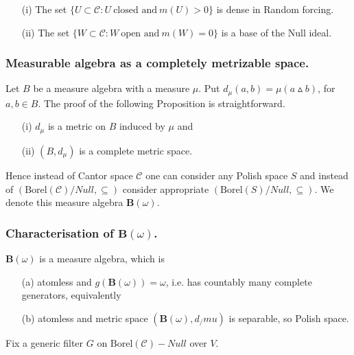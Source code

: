 \begin{corollary}
 \begin{itemize}
  \item[(i)] The set $\{U \subset \mathcal C : U \ \mbox{closed and} \ m(U) > 0 \}$ is dense in Random forcing.
  \item[(ii)] The set $\{W \subset \mathcal C : W \ \mbox{open and} \ m(W) = 0 \}$ is a base of the Null ideal.
 \end{itemize}
\end{corollary}

\subsubsection{Measurable algebra as a completely metrizable space.}

Let $B$ be a measure algebra with a measure $\mu$. Put
$d_\mu(a,b) = \mu(a \vartriangle b)$, for $a,b \in B$. The proof
of the following Proposition is straightforward.

\begin{proposition}
 \begin{itemize}
  \item[(i)] $d_\mu$ is a metric on $B$ induced by $\mu$ and
  \item[(ii)] $(B,d_\mu)$ is a complete metric space.
 \end{itemize}
\end{proposition}

Hence instead of Cantor space $\mathcal C$ one can consider any Polish space $S$
and instead of $(\mbox{Borel}(\mathcal C) / Null,\subseteq)$ consider
appropriate $(\mbox{Borel}(S) / Null,\subseteq)$. We denote this measure
algebra $\mathbf B(\omega)$.

\subsubsection{Characterisation of $\mathbf B(\omega)$.}

$\mathbf B(\omega)$ is a measure algebra, which is
\begin{itemize}
 \item[(a)] atomless and $g(\mathbf B(\omega)) = \omega$, i.e. has
	countably many complete generators, equivalently
 \item[(b)] atomless and metric space $(\mathbf B(\omega),d_/mu)$
	is separable, so Polish space.
\end{itemize}


Fix a generic filter $G$ on $\mbox{Borel}(\mathcal C) - Null$ over $V$.

